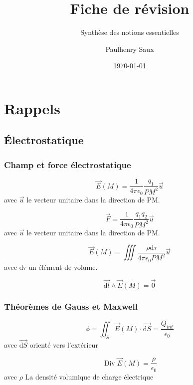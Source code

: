 \documentclass[french]{yLectureNote}
\title{Fiche de révision}
\subtitle{Synthèse des notions essentielles}
\author{Paulhenry Saux}
\date{\today}
\renewcommand{\vec}{\overrightarrow}
\renewcommand{\vec}{\overrightarrow}
\newcommand{\dd}[0]{\mathrm{d}}
\newcommand{\E}{\vec{E}(M)}
\DeclareMathOperator{\Div}{Div}
\begin{document}
\chapter{Rappels}

\section{Électrostatique}

\subsection{Champ et force électrostatique}

\begin{theorem}
    \[\E = \frac{1}{4\pi\epsilon_0}\frac{q_1}{PM^2}\vec{u}\] avec \(\vec{u}\) le vecteur unitaire dans la direction de PM.

\end{theorem}


\begin{theorem}
    \[\vec{F} = \frac{1}{4\pi\epsilon_0}\frac{q_1q_2}{PM^2}\vec{u}\] avec \(\vec{u}\) le vecteur unitaire dans la direction de PM.

\end{theorem}


\begin{theorem}
    $$\E = \iiint \frac{\rho \dd \tau}{4\pi \epsilon_0 PM^2}\vec{u}$$ avec $\dd \tau$ un élément de volume.

\end{theorem}


\begin{definition}
    $$\vec{\dd l}\wedge \E = \vec{0}$$

\end{definition}

\subsection{Théorèmes de Gauss et Maxwell}

\begin{theorem}
    $$\phi = \iint_{S} \E\cdot \vec{\dd S} = \frac{Q_{int}}{\epsilon_0}$$ avec $\vec{\dd S}$ orienté vers l'extérieur

\end{theorem}

\begin{theorem}
    $$\Div\E = \frac{\rho}{\epsilon_0}$$ avec $\rho$ La densité volumique de charge électrique

\end{theorem}
\end{document}
